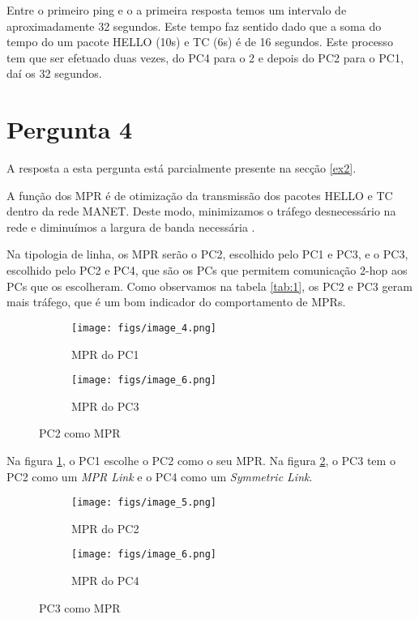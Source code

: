 Entre o primeiro ping e o a primeira resposta temos um intervalo de aproximadamente 32 segundos.
Este tempo faz sentido dado que a soma do tempo do um pacote HELLO (10s) e TC (6s) é de 16 segundos.
Este processo tem que ser efetuado duas vezes, do PC4 para o 2 e depois do PC2 para o PC1, daí os 32 segundos.

\clearpage

\section{Pergunta 4} \label{ex4}

A resposta a esta pergunta está parcialmente presente na secção \ref{ex2}.

A função dos MPR é de otimização da transmissão dos pacotes HELLO e TC dentro da rede MANET.
Deste modo, minimizamos o tráfego desnecessário na rede e diminuímos a largura de banda necessária \cite{mpr}.

Na tipologia de linha, os MPR serão o PC2, escolhido pelo PC1 e PC3, e o PC3, escolhido pelo PC2 e PC4, que são os PCs que permitem comunicação 2-hop aos PCs que os escolheram.
Como observamos na tabela \ref{tab:1}, os PC2 e PC3 geram mais tráfego, que é um bom indicador do comportamento de MPRs.

\begin{figure}[H]
    \centering
    \begin{subfigure}{.5\textwidth}
      \centering
      \texttt{[image: figs/image\_4.png]}
      \caption{MPR do PC1}
      \label{fig:4_1}
    \end{subfigure}%
    \begin{subfigure}{.5\textwidth}
      \centering
      \texttt{[image: figs/image\_6.png]}
      \caption{MPR do PC3}
      \label{fig:4_2}
    \end{subfigure}
    \caption{PC2 como MPR}
    \label{fig:4}
\end{figure}

Na figura \ref{fig:4_1}, o PC1 escolhe o PC2 como o seu MPR.
Na figura \ref{fig:4_2}, o PC3 tem o PC2 como um \textit{MPR Link} e o PC4 como um \textit{Symmetric Link}.

\begin{figure}[H]
    \centering
    \begin{subfigure}{.5\textwidth}
      \centering
      \texttt{[image: figs/image\_5.png]}
      \caption{MPR do PC2}
      \label{fig:5_1}
    \end{subfigure}%
    \begin{subfigure}{.5\textwidth}
      \centering
      \texttt{[image: figs/image\_6.png]}
      \caption{MPR do PC4}
      \label{fig:5_2}
    \end{subfigure}
    \caption{PC3 como MPR}
    \label{fig:5}
\end{figure}

